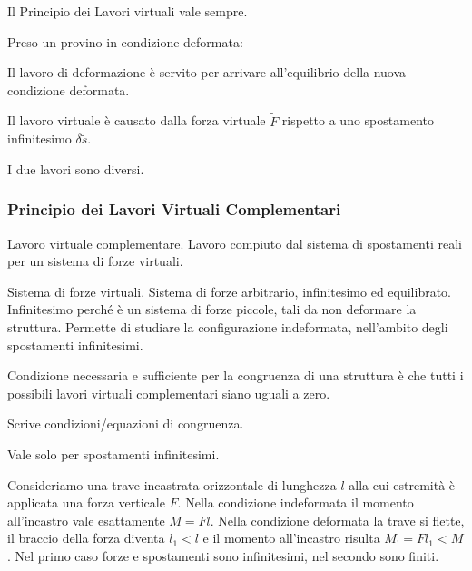 Il Principio dei Lavori virtuali vale sempre.

\begin{esempioBox}
Preso un provino in condizione deformata:
\begin{compactitem}
    \item Il lavoro di deformazione è servito per arrivare all'equilibrio della nuova condizione deformata.
    \item Il lavoro virtuale è causato dalla forza virtuale $\tilde{F}$ rispetto a uno spostamento infinitesimo $\delta \tilde{s}$.
\end{compactitem}
I due lavori sono diversi.

\end{esempioBox}



\subsubsection*{Principio dei Lavori Virtuali Complementari}
\begin{definizioneBox}
    Lavoro virtuale complementare. Lavoro compiuto dal sistema di spostamenti reali per un sistema di forze virtuali.
\end{definizioneBox}
\begin{definizioneBox}
    Sistema di forze virtuali. Sistema di forze arbitrario, infinitesimo ed equilibrato.\\
    Infinitesimo perché è un sistema di forze piccole, tali da non deformare la struttura. Permette di studiare la configurazione indeformata, nell'ambito degli spostamenti infinitesimi.
\end{definizioneBox}

\begin{enunciatoBox}
    Condizione necessaria e sufficiente per la congruenza di una struttura è che tutti i possibili lavori virtuali complementari siano uguali a zero.

\end{enunciatoBox}

\begin{compactitem}
    \item Scrive condizioni/equazioni di congruenza.
    \item Vale solo per spostamenti infinitesimi.
\end{compactitem}

\begin{esempioBox}
    Consideriamo una trave incastrata orizzontale di lunghezza $l$ alla cui estremità è applicata una forza verticale $F$.
    Nella condizione indeformata il momento all'incastro vale esattamente $ M = Fl$.
    Nella condizione deformata la trave si flette, il braccio della forza diventa $l_1<l$ e il momento all'incastro risulta $M_! = Fl_1<M$.
    Nel primo caso forze e spostamenti sono infinitesimi, nel secondo sono finiti.
\end{esempioBox}








